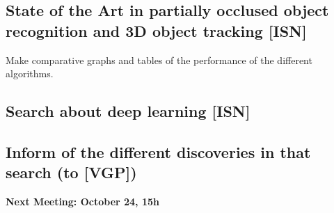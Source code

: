 \documentclass{article}
\newenvironment{myindentpar}[1]%
 {\begin{list}{}%
         {\setlength{\leftmargin}{#1}}%
         \item[]%
 }
 {\end{list}}
\begin{document}
	\subsection{State of the Art in partially occlused object recognition and 3D object tracking [ISN]}
		\begin{myindentpar}{1cm} 
		Make comparative graphs and tables of the performance of the different algorithms. 			
		\end{myindentpar}
	\subsection{Search about deep learning [ISN]}
	\subsection{Inform of the different discoveries in that search (to [VGP])}

\begin {center}
{\Large \textbf{Next Meeting: October 24, 15h }}
\end{center}
\end{document}
